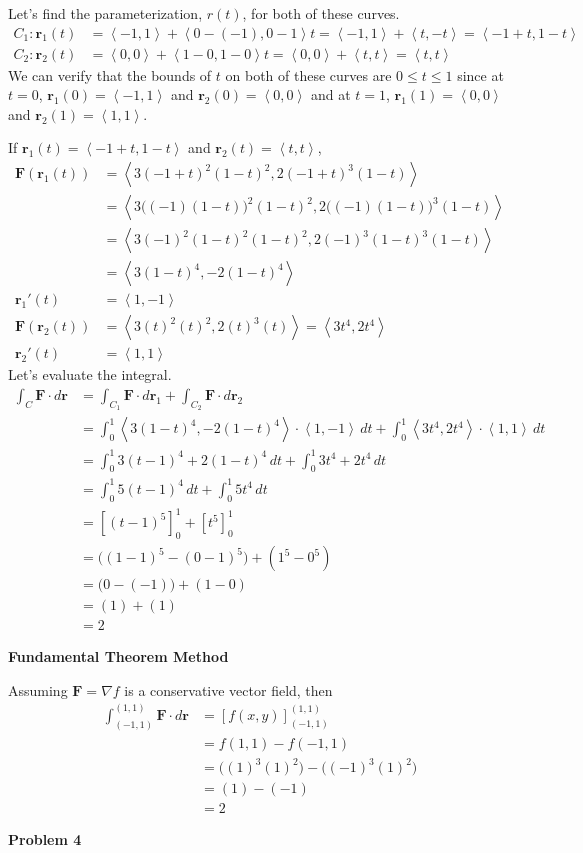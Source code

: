 \documentclass{article}
\newcommand{\lrp}[1]{\left( #1 \right)}
\newcommand{\lra}[1]{\left\langle #1 \right\rangle}
\newcommand{\lrb}[1]{\left[ #1 \right]}
\renewcommand{\r}[0]{\mathbf{r}}
\newcommand{\F}[0]{\mathbf{F}}
\begin{document}
Let's find the parameterization, $r(t)$, for both of these curves.
\begin{align*}
    C_1: \r_1(t)&=\lra{-1,1}+\lra{0 - (-1), 0 - 1}t = \lra{-1, 1}+\lra{ t, -t}=\lra{-1 + t, 1 -t}\tag{$0\leq t \leq 1$}\\
    C_2: \r_2(t)&=\lra{0,0}+ \lra{1 - 0, 1 - 0}t=\lra{0,0}+\lra{t, t}=\lra{t, t}\tag{$0\leq t \leq 1$}
\end{align*}
We can verify that the bounds of $t$ on both of these curves are $0\leq t\leq 1$ since at $t=0$, $\r_1(0)=\lra{-1,1}$ and $\r_2(0)=\lra{0,0}$ and at $t=1$, $\r_1(1)=\lra{0,0}$ and $\r_2(1)=\lra{1,1}$.

If $\r_1(t)=\lra{-1 + t, 1 - t}$ and $\r_2(t)=\lra{t,t}$,
\begin{align*}
    \F\lrp{\r_1(t)}&=\lra{3(-1+t)^2(1-t)^2, 2(-1+t)^3(1-t)}\\
    &=\lra{3\Big((-1)(1-t)\Big)^2(1-t)^2, 2\Big((-1)(1-t)\Big)^3(1-t)}\\
    &=\lra{3(-1)^2(1-t)^2(1-t)^2, 2(-1)^3(1-t)^3(1-t)}\\
    &=\lra{3(1-t)^4,-2(1-t)^4}\\
    \r_1'(t)&=\lra{1,-1}\\
    \F\lrp{\r_2(t)}&=\lra{3(t)^2(t)^2, 2(t)^3(t)}=\lra{3t^4, 2t^4}\\
    \r_2'(t)&=\lra{1,1}
\end{align*}
Let's evaluate the integral.
\begin{align*}
    \int_C \F\cdot d\r &=\int_{C_1} \F\cdot d\r_1 + \int_{C_2}\F\cdot d\r_2\\
    &=\int_0^1 \lra{3(1-t)^4, -2(1-t)^4}\cdot \lra{1,-1}\,dt+\int_0^1 \lra{3t^4,2t^4}\cdot \lra{1,1}\,dt\\
    &=\int_0^1 3(t-1)^4 + 2(1-t)^4\,dt+\int_0^1 3t^4 + 2t^4\,dt\\
    &=\int_0^1 5(t-1)^4\,dt +\int_0^1 5t^4\,dt\\
    &=\lrb{(t-1)^5}_0^1 + \lrb{t^5}_0^1\tag{or do u-sub $u=t-1$}\\
    &= \Big((1-1)^5 - (0-1)^5\Big)+\lrp{1^5 - 0^5}\\
    &=\Big(0-(-1)\Big)+\lrp{1-0}\\
    &=\lrp{1}+\lrp{1}\\
    &=\boxed{2}
\end{align*}
{}\textbf{Fundamental Theorem Method}

Assuming $\F = \nabla f $ is a conservative vector field, then
\begin{align*}
    \int_{(-1,1)}^{(1,1)} \F \cdot d\r&= \lrb{f(x,y)}_{(-1,1)}^{(1,1)}\\
    &=f(1,1)-f(-1,1)\\
    &=\Big((1)^3(1)^2\Big)-\Big((-1)^3(1)^2\Big)\tag{remember: $f(x,y)=x^3y^2$}\\
    &=\lrp{1}-\lrp{-1}\\
    &=\boxed{2}
\end{align*}
\newpage
{}
{}\textbf{Problem 4}
\end{document}
